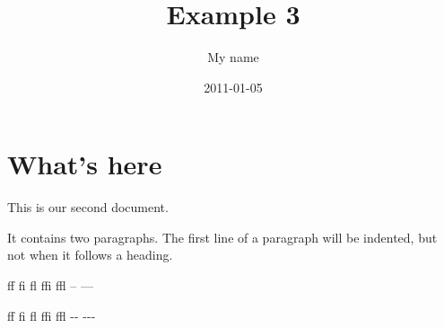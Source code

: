 ﻿\documentclass[a4paper,11pt]{article}
\title{Example 3}
\author{My name}
\date{2011-01-05}
\begin{document}
\maketitle
\section{What's here}
This        is   our
second document.

It contains two paragraphs. The first line of a paragraph will be
indented, but not when it follows a heading.

ff fi fl ffi ffl -- ---

f\/f f\/i f\/l f\/f\/i f\/f\/l -\/- -\/-\/-
\end{document}
